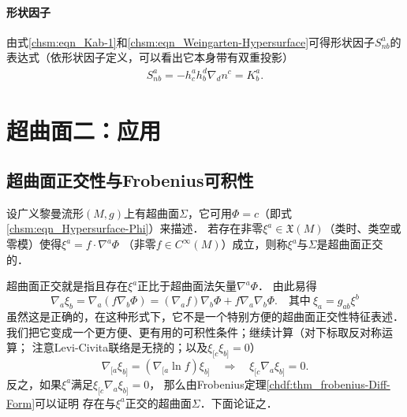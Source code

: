 \paragraph{形状因子}
由式\eqref{chsm:eqn_Kab-1}和\eqref{chsm:eqn_Weingarten-Hypersurface}可得形状因子$S^a_{n b}$的
表达式（依形状因子定义，可以看出它本身带有双重投影）
\begin{align}
    S^a_{n b} =- h_c^a h_b^d \nabla_d n^c= K_{b}^a .
\end{align}






\section{超曲面二：应用}



\subsection{超曲面正交性与Frobenius可积性}\label{chsm:sec_hypersurface-orthogonal}


\begin{definition}\label{chsm:def_hypersurface-orthogonal}
    设广义黎曼流形$(M,g)$上有超曲面$\Sigma$，它可用$\Phi=c$（即式\eqref{chsm:eqn_Hypersurface-Phi}）来描述．
    若存在非零$\xi^a \in \mathfrak{X}(M)$（类时、类空或零模）使得$\xi^a= f\cdot \nabla^a\Phi$
    （非零$f\in C^\infty(M)$）成立，则称$\xi^a$与$\Sigma$是{\heiti 超曲面正交}的．
\end{definition}

超曲面正交就是指且存在$\xi^a$正比于超曲面法矢量$\nabla^a\Phi$．
由此易得
\begin{equation}
    \nabla_{a} \xi_{b} = \nabla_{a} (f \nabla_{b} \Phi)
      = (\nabla_{a} f) \nabla_{b} \Phi + f \nabla_{a}  \nabla_{b} \Phi .
      \quad \text{其中}\ \xi_a = g_{ab}\xi^b
\end{equation}
虽然这是正确的，在这种形式下，它不是一个特别方便的超曲面正交性特征表述．
我们把它变成一个更方便、更有用的可积性条件；继续计算（对下标取反对称运算；
注意Levi-Civita联络是无挠的；以及$\xi_{[c} \xi_{b]}=0$）
\begin{equation}
    \nabla_{[a} \xi_{b]} = (\nabla_{[a} \ln f) \xi_{b]} \quad   \Rightarrow \quad
    \xi_{[c}\nabla_{a} \xi_{b]} = 0.
\end{equation}
反之，如果$\xi^a$满足$\xi_{[c}\nabla_{a} \xi_{b]} = 0$，
那么由Frobenius定理\ref{chdf:thm_frobenius-Diff-Form}可以证明
存在与$\xi^a$正交的超曲面$\Sigma$．下面论证之．

